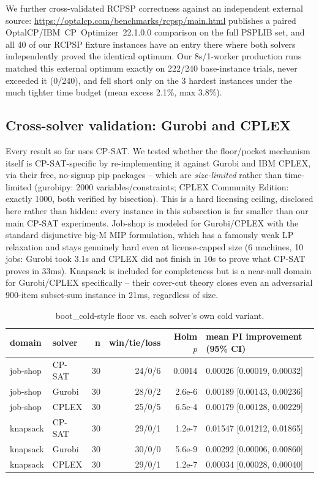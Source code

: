 \documentclass[11pt]{article}                        %
\begin{document}
We further cross-validated RCPSP correctness against an independent external
source: \url{https://optalcp.com/benchmarks/rcpsp/main.html} publishes a
paired OptalCP/IBM~CP~Optimizer~22.1.0.0 comparison on the full PSPLIB set,
and all 40 of our RCPSP fixture instances have an entry there where both
solvers independently proved the identical optimum. Our 8s/1-worker
production runs matched this external optimum exactly on 222/240 base-instance
trials, never exceeded it (0/240), and fell short only on the 3 hardest
instances under the much tighter time budget (mean excess 2.1\%, max 3.8\%).

\subsection{Cross-solver validation: Gurobi and CPLEX}
\label{sec:multisolver}
Every result so far uses CP-SAT. We tested whether the floor/pocket
mechanism itself is CP-SAT-specific by re-implementing it against Gurobi and
IBM CPLEX, via their free, no-signup pip packages -- which are
\emph{size-limited} rather than time-limited (gurobipy: 2000
variables/constraints; CPLEX Community Edition: exactly 1000, both verified
by bisection). This is a hard licensing ceiling, disclosed here rather than
hidden: every instance in this subsection is far smaller than our main
CP-SAT experiments. Job-shop is modeled for Gurobi/CPLEX with the standard
disjunctive big-M MIP formulation, which has a famously weak LP relaxation
and stays genuinely hard even at license-capped size (6 machines, 10 jobs:
Gurobi took 3.1s and CPLEX did not finish in 10s to prove what CP-SAT proves
in 33ms). Knapsack is included for completeness but is a near-null domain
for Gurobi/CPLEX specifically -- their cover-cut theory closes even an
adversarial 900-item subset-sum instance in 21ms, regardless of size.

\begin{table}[t]
\centering
\small
\begin{tabular}{llrrrl}
\toprule
domain & solver & n & win/tie/loss & Holm $p$ & mean PI improvement (95\% CI) \\
\midrule
job-shop & CP-SAT  & 30 & 24/0/6 & 0.0014 & 0.00026 [0.00019, 0.00032] \\
job-shop & Gurobi  & 30 & 28/0/2 & 2.6e-6 & 0.00189 [0.00143, 0.00236] \\
job-shop & CPLEX   & 30 & 25/0/5 & 6.5e-4 & 0.00179 [0.00128, 0.00229] \\
knapsack & CP-SAT  & 30 & 29/0/1 & 1.2e-7 & 0.01547 [0.01212, 0.01865] \\
knapsack & Gurobi  & 30 & 30/0/0 & 5.6e-9 & 0.00292 [0.00006, 0.00860] \\
knapsack & CPLEX   & 30 & 29/0/1 & 1.2e-7 & 0.00034 [0.00028, 0.00040] \\
\bottomrule
\end{tabular}
\caption{boot\_cold-style floor vs. each solver's own cold variant.}
\label{tab:multisolver}
\end{table}
\end{document}
